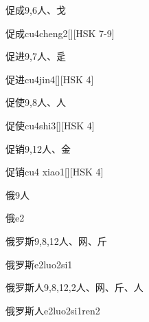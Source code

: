 \begin{Entry}{促成}{9,6}{⼈、⼽}
  \begin{Phonetics}{促成}{cu4cheng2}[][HSK 7-9]
  \end{Phonetics}
\end{Entry}

\begin{Entry}{促进}{9,7}{⼈、⾡}
  \begin{Phonetics}{促进}{cu4jin4}[][HSK 4]
  \end{Phonetics}
\end{Entry}

\begin{Entry}{促使}{9,8}{⼈、⼈}
  \begin{Phonetics}{促使}{cu4shi3}[][HSK 4]
  \end{Phonetics}
\end{Entry}

\begin{Entry}{促销}{9,12}{⼈、⾦}
  \begin{Phonetics}{促销}{cu4 xiao1}[][HSK 4]
  \end{Phonetics}
\end{Entry}

\begin{Entry}{俄}{9}{⼈}
  \begin{Phonetics}{俄}{e2}
  \end{Phonetics}
\end{Entry}

\begin{Entry}{俄罗斯}{9,8,12}{⼈、⽹、⽄}
  \begin{Phonetics}{俄罗斯}{e2luo2si1}
  \end{Phonetics}
\end{Entry}

\begin{Entry}{俄罗斯人}{9,8,12,2}{⼈、⽹、⽄、⼈}
  \begin{Phonetics}{俄罗斯人}{e2luo2si1ren2}
  \end{Phonetics}
\end{Entry}

